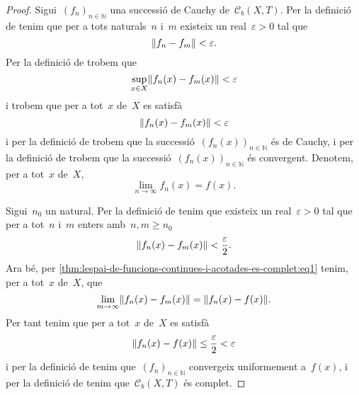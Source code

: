 \documentclass[../equacions-diferencials-I.tex]{subfiles}
\begin{document}
    \begin{proof}
        Sigui~\((f_{n})_{n\in\mathbb{N}}\) una successió de Cauchy de~\(\mathcal{C}_{b}(X,T)\).
        Per la definició de  tenim que per a tots naturals~\(n\) i~\(m\) existeix un real~\(\varepsilon>0\) tal que
        \[
            \norm{f_{n}-f_{m}}<\varepsilon.
        \]
        Per la definició de  trobem que
        \[
            \sup_{x\in X}\norm{f_{n}(x)-f_{m}(x)}<\varepsilon
        \]
        i trobem que per a tot~\(x\) de~\(X\) es satisfà
        \[
            \norm{f_{n}(x)-f_{m}(x)}<\varepsilon
        \]
        i per la definició de  trobem que la successió~\((f_{n}(x))_{n\in\mathbb{N}}\) és de Cauchy, i per la definició de  trobem que la successió~\((f_{n}(x))_{n\in\mathbb{N}}\) és convergent.
        Denotem, per a tot~\(x\) de~\(X\),
        \begin{equation}
            \label{thm:lespai-de-funcions-continues-i-acotades-es-complet:eq1}
            \lim_{n\to\infty}f_{n}(x)=f(x).
        \end{equation}

        Sigui~\(n_{0}\) un natural.
        Per la definició de  tenim que existeix un real~\(\varepsilon>0\) tal que per a tot~\(n\) i~\(m\) enters amb~\(n,m\geq n_{0}\)
        \[
            \norm{f_{n}(x)-f_{m}(x)}<\frac{\varepsilon}{2}.
        \]
        Ara bé, per \eqref{thm:lespai-de-funcions-continues-i-acotades-es-complet:eq1} tenim, per a tot~\(x\) de~\(X\), que
        \[
            \lim_{m\to\infty}\norm{f_{n}(x)-f_{m}(x)}=\norm{f_{n}(x)-f(x)}.
        \]
        Per tant tenim que per a tot~\(x\) de~\(X\) es satisfà
        \[
            \norm{f_{n}(x)-f(x)}\leq\frac{\varepsilon}{2}<\varepsilon
        \]
        i per la definició de  tenim que~\((f_{n})_{n\in\mathbb{N}}\) convergeix uniformement a~\(f(x)\), i per la definició de  tenim que~\(\mathcal{C}_{b}(X,T)\) és complet.
    \end{proof}
\end{document}
